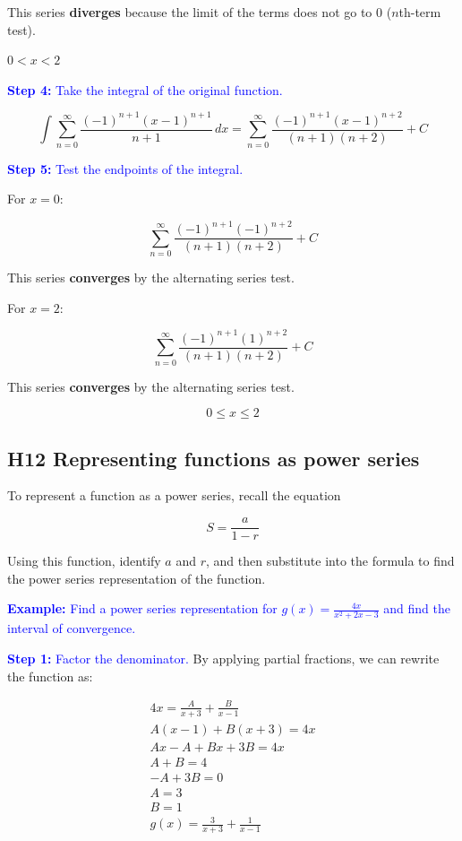 \documentclass[letterpaper, 12pt]{article}
\newcommand{\example}[1]{\textcolor{blue}{\textbf{Example:} #1}}
\newcommand{\step}[2]{\textcolor{blue}{\textbf{Step #1:} #2}}
\begin{document}
This series \textbf{diverges} because the limit of the terms does not go to 0 ($n$th-term test).

$\boxed{ 0 < x < 2}$

\step{4}{Take the integral of the original function.}

$$\int \displaystyle \sum_{n=0}^\infty \frac{(-1)^{n+1}(x-1)^{n+1}}{n+1} \, dx = \displaystyle \sum_{n=0}^\infty \frac{(-1)^{n+1}(x-1)^{n+2}}{(n+1)(n+2)} + C$$

\step{5}{Test the endpoints of the integral.}

For $x=0$:

$$\displaystyle \sum_{n=0}^\infty \frac{(-1)^{n+1}(-1)^{n+2}}{(n+1)(n+2)} + C$$

This series \textbf{converges} by the alternating series test.

For $x=2$:

$$\displaystyle \sum_{n=0}^\infty \frac{(-1)^{n+1}(1)^{n+2}}{(n+1)(n+2)} + C$$

This series \textbf{converges} by the alternating series test.

$$\boxed{ 0 \leq x \leq 2}$$

\subsection*{H12 Representing functions as power series}

To represent a function as a power series, recall the equation

$$S = \frac{a}{1-r}$$

Using this function, identify $a$ and $r$, and then substitute into the formula to find the power series representation of the function.

\example{Find a power series representation for $\displaystyle g(x) = \frac{4x}{x^2+2x-3}$ and find the interval of convergence.}

\step{1}{Factor the denominator.} By applying partial fractions, we can rewrite the function as:

\begin{gather*}
4x = \frac{A}{x+3} + \frac{B}{x-1} \\
A(x-1) + B(x+3) = 4x \\
Ax - A + Bx + 3B = 4x \\
A + B = 4 \\
- A + 3B = 0 \\
A = 3 \\
B = 1 \\
g(x) = \frac{3}{x+3} + \frac{1}{x-1}
\end{gather*}
\end{document}

